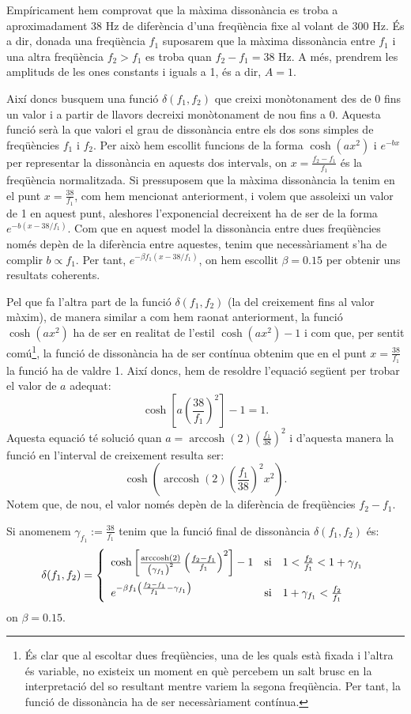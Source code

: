 \documentclass{article}
\theoremstyle{math}
\newcommand{\0}{\ensuremath{\vb{0}}}
\DeclareMathOperator{\arccosh}{arccosh}
\begin{document}
Empíricament hem comprovat que la màxima dissonància es troba a aproximadament 38 Hz de diferència d'una freqüència fixe al volant de 300 Hz. És a dir, donada una freqüència $f_1$ suposarem que la màxima dissonància entre $f_1$ i una altra freqüència $f_2>f_1$ es troba quan $f_2-f_1=38\text{ Hz}$. A més, prendrem les amplituds de les ones constants i iguals a 1, és a dir, $A=1$.\par Així doncs busquem una funció $\delta(f_1,f_2)$ que creixi monòtonament des de 0 fins un valor i a partir de llavors decreixi monòtonament de nou fins a 0. Aquesta funció serà la que valori el grau de dissonància entre els dos sons simples de freqüències $f_1$ i $f_2$. Per això hem escollit funcions de la forma $\cosh\left(ax^2\right)$ i $e^{-bx}$ per representar la dissonància en aquests dos intervals, on $x=\frac{f_2-f_1}{f_1}$ és la freqüència normalitzada. Si pressuposem que la màxima dissonància la tenim en el punt $x=\frac{38}{f_1}$, com hem mencionat anteriorment, i volem que assoleixi un valor de 1 en aquest punt, aleshores l'exponencial decreixent ha de ser de la forma $e^{-b\left(x-38/f_1\right)}$. Com que en aquest model la dissonància entre dues freqüències només depèn de la diferència entre aquestes, tenim que necessàriament s'ha de complir $b\propto f_1$. Per tant, $e^{-\beta f_1(x-38/f_1)}$, on hem escollit $\beta=0.15$ per obtenir uns resultats coherents.\par Pel que fa l'altra part de la funció $\delta(f_1,f_2)$ (la del creixement fins al valor màxim), de manera similar a com hem raonat anteriorment, la funció $\cosh\left(ax^2\right)$ ha de ser en realitat de l'estil $\cosh\left(ax^2\right)-1$ i com que, per sentit comú\footnote{És clar que al escoltar dues freqüències, una de les quals està fixada i l'altra és variable, no existeix un moment en què percebem un salt brusc en la interpretació del so resultant mentre variem la segona freqüència. Per tant, la funció de dissonància ha de ser necessàriament contínua.}, la funció de dissonància ha de ser contínua obtenim que en el punt $x=\frac{38}{f_1}$ la funció ha de valdre 1. Així doncs, hem de resoldre l'equació següent per trobar el valor de $a$ adequat:
$$\cosh\left[a\left(\frac{38}{f_1}\right)^2\right]-1=1.$$ Aquesta equació té solució quan $a=\arccosh(2)\left(\frac{f_1}{38}\right)^2$ i d'aquesta manera la funció en l'interval de creixement resulta ser: $$\cosh\left(\arccosh(2)\left(\frac{f_1}{38}\right)^2x^2\right).$$ Notem que, de nou, el valor només depèn de la diferència de freqüències $f_2-f_1$.\par Si anomenem $\gamma_{f_1}:=\frac{38}{f_1}$ tenim que la funció final de dissonància $\delta(f_1,f_2)$ és: $$\delta(f_1,f_2)=
    \left\{\begin{array}{lll}
        \cosh\left[\frac{\arccosh(2)}{\left(\gamma_{f_1}\right)^2}\left(\frac{f_2-f_1}{f_1}\right)^2\right]-1 & \text{si} & 1<\frac{f_2}{f_1}<1+\gamma_{f_1}\vspace{5pt}\\
        e^{-\beta f_1\left(\frac{f_2-f_1}{f_1}-\gamma_{f_1}\right)} & \text{si} & 1+\gamma_{f_1}<\frac{f_2}{f_1}
    \end{array}\right.$$ on $\beta=0.15$.
\end{document}
